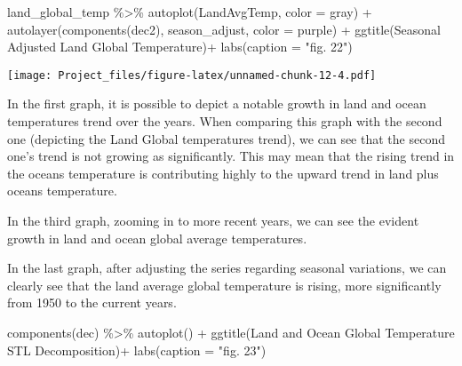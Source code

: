 \documentclass[
]{article}
\newenvironment{Shaded}{\begin{snugshade}}{\end{snugshade}}
\newcommand{\AttributeTok}[1]{\textcolor[rgb]{0.77,0.63,0.00}{#1}}
\newcommand{\FunctionTok}[1]{\textcolor[rgb]{0.00,0.00,0.00}{#1}}
\newcommand{\NormalTok}[1]{#1}
\newcommand{\SpecialCharTok}[1]{\textcolor[rgb]{0.00,0.00,0.00}{#1}}
\newcommand{\StringTok}[1]{\textcolor[rgb]{0.31,0.60,0.02}{#1}}
\begin{document}
\begin{Shaded}
\begin{Highlighting}[]
\NormalTok{land\_global\_temp }\SpecialCharTok{\%\textgreater{}\%}
  \FunctionTok{autoplot}\NormalTok{(LandAvgTemp, }\AttributeTok{color =} \StringTok{\textquotesingle{}gray\textquotesingle{}}\NormalTok{) }\SpecialCharTok{+} 
  \FunctionTok{autolayer}\NormalTok{(}\FunctionTok{components}\NormalTok{(dec2), season\_adjust, }\AttributeTok{color =} \StringTok{\textquotesingle{}purple\textquotesingle{}}\NormalTok{) }\SpecialCharTok{+} 
  \FunctionTok{ggtitle}\NormalTok{(}\StringTok{\textquotesingle{}Seasonal Adjusted Land Global Temperature\textquotesingle{}}\NormalTok{)}\SpecialCharTok{+}
  \FunctionTok{labs}\NormalTok{(}\AttributeTok{caption =} \StringTok{"fig. 22"}\NormalTok{)}
\end{Highlighting}
\end{Shaded}

\texttt{[image: Project\_files/figure-latex/unnamed-chunk-12-4.pdf]}

In the first graph, it is possible to depict a notable growth in land
and ocean temperatures trend over the years. When comparing this graph
with the second one (depicting the Land Global temperatures trend), we
can see that the second one's trend is not growing as significantly.
This may mean that the rising trend in the oceans temperature is
contributing highly to the upward trend in land plus oceans temperature.

In the third graph, zooming in to more recent years, we can see the
evident growth in land and ocean global average temperatures.

In the last graph, after adjusting the series regarding seasonal
variations, we can clearly see that the land average global temperature
is rising, more significantly from 1950 to the current years.

\begin{Shaded}
\begin{Highlighting}[]
\FunctionTok{components}\NormalTok{(dec) }\SpecialCharTok{\%\textgreater{}\%}
  \FunctionTok{autoplot}\NormalTok{() }\SpecialCharTok{+} \FunctionTok{ggtitle}\NormalTok{(}\StringTok{\textquotesingle{}Land and Ocean Global Temperature STL Decomposition\textquotesingle{}}\NormalTok{)}\SpecialCharTok{+}
  \FunctionTok{labs}\NormalTok{(}\AttributeTok{caption =} \StringTok{"fig. 23"}\NormalTok{)}
\end{Highlighting}
\end{Shaded}
\end{document}
